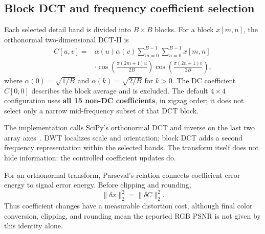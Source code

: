 \documentclass[11pt,a4paper]{article}
\begin{document}
\subsection{Block DCT and frequency coefficient selection}
Each selected detail band is divided into $B\times B$ blocks. For a block $x[m,n]$,
the orthonormal two-dimensional DCT-II is
\begin{equation}
\begin{split}
C[u,v]={}&\alpha(u)\alpha(v)\sum_{m=0}^{B-1}\sum_{n=0}^{B-1}x[m,n]\\
&\cdot\cos\!\left(\frac{\pi(2m+1)u}{2B}\right)
\cos\!\left(\frac{\pi(2n+1)v}{2B}\right),
\end{split}
\end{equation}
where $\alpha(0)=\sqrt{1/B}$ and $\alpha(k)=\sqrt{2/B}$ for $k>0$.
The DC coefficient $C[0,0]$ describes the block average and is excluded. The default
$4\times4$ configuration uses \textbf{all 15 non-DC coefficients}, in zigzag order;
it does not select only a narrow mid-frequency subset of that DCT block.

The implementation calls SciPy's orthonormal DCT and inverse on the last two array
axes~\cite{scipy}. DWT localizes scale and orientation; block DCT adds a second
frequency representation within the selected bands. The transform itself does not
hide information: the controlled coefficient updates do.

For an orthonormal transform, Parseval's relation connects coefficient error energy
to signal error energy. Before clipping and rounding,
\begin{equation}
\|\delta x\|_2^2=\|\delta C\|_2^2.
\end{equation}
Thus coefficient changes have a measurable distortion cost, although final color
conversion, clipping, and rounding mean the reported RGB PSNR is not given by this
identity alone.
\end{document}
